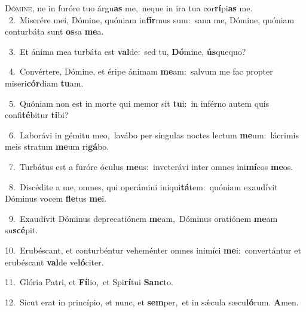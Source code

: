 \lettrine{\initial\textcolor{\initialcolor}{D}}{ómine,} ne in furóre tuo árgu\textbf{as} me,~\star neque in ira tua cor\-\textbf{rí}\-pi\textbf{as} me.\\
{\numbfont\textcolor{\numbcolor}{~2.}}~Miserére mei, Dómine, quóniam in\-\textbf{fír}\-mus sum:~\star sana me, Dómine, quóniam conturbáta sunt \textbf{os}\-sa \textbf{me}\-a.\par
{\numbfont\textcolor{\numbcolor}{~3.}}~Et ánima mea turbáta est \textbf{val}\-de:~\star sed tu, \textbf{Dó}\-mine, \textbf{ús}\-quequo?\par
{\numbfont\textcolor{\numbcolor}{~4.}}~Convértere, Dómine, et éripe ánimam \textbf{me}\-am:~\star salvum me fac propter miseri\-\textbf{cór}\-diam \textbf{tu}\-am.\par
{\numbfont\textcolor{\numbcolor}{~5.}}~Quóniam non est in morte qui memor sit \textbf{tu}\-i:~\star in inférno autem quis confi\-\textbf{té}\-bitur \textbf{ti}\-bi?\par
{\numbfont\textcolor{\numbcolor}{~6.}}~Laborávi in gémitu meo,~\dagger lavábo per síngulas noctes lectum \textbf{me}\-um:~\star lácrimis meis stratum \textbf{me}\-um ri\-\textbf{gá}\-bo.\par
{\numbfont\textcolor{\numbcolor}{~7.}}~Turbátus est a furóre óculus \textbf{me}\-us:~\star inveterávi inter omnes ini\-\textbf{mí}\-cos \textbf{me}\-os.\par
{\numbfont\textcolor{\numbcolor}{~8.}}~Discédite a me, omnes, qui operámini iniqui\-\textbf{tá}\-tem:~\star quóniam exaudívit Dóminus vocem \textbf{fle}\-tus \textbf{me}\-i.\par
{\numbfont\textcolor{\numbcolor}{~9.}}~Exaudívit Dóminus deprecatiónem \textbf{me}\-am,~\star Dóminus oratiónem \textbf{me}\-am su\-\textbf{scé}\-pit.\par
{\numbfont\textcolor{\numbcolor}{10.}}~Erubéscant, et conturbéntur veheménter omnes inimíci \textbf{me}\-i:~\star convertántur et erubéscant \textbf{val}\-de ve\-\textbf{ló}\-citer.\par
{\numbfont\textcolor{\numbcolor}{11.}}~Glória Patri, et \textbf{Fí}\-lio,~\star et Spi\-\textbf{rí}\-tui \textbf{Sanc}\-to.\par
{\numbfont\textcolor{\numbcolor}{12.}}~Sicut erat in princípio, et nunc, et \textbf{sem}\-per,~\star et in sǽcula sæcu\-\textbf{ló}\-rum. \textbf{A}\-men.\par
